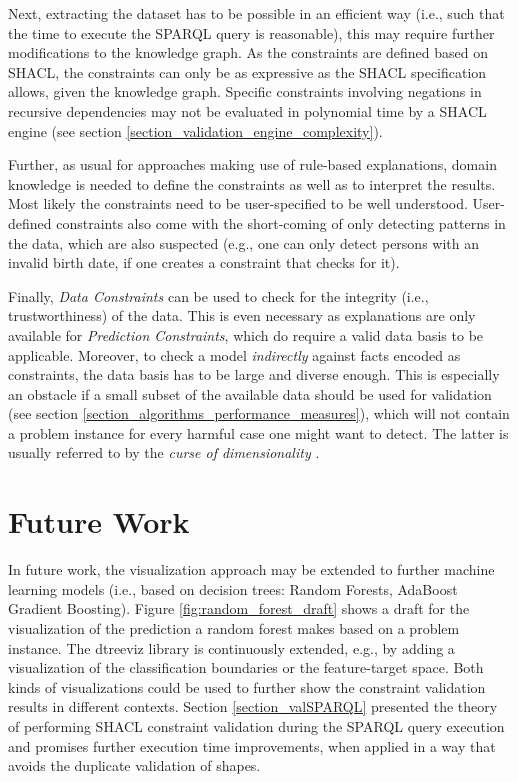 Next, extracting the dataset has to be possible in an efficient way (i.e., such that the time to execute the SPARQL query is reasonable), this may require further modifications to the knowledge graph. As the constraints are defined based on SHACL, the constraints can only be as expressive as the SHACL specification allows, given the knowledge graph. Specific constraints involving negations in recursive dependencies may not be evaluated in polynomial time by a SHACL engine (see section \ref{section_validation_engine_complexity}).

Further, as usual for approaches making use of rule-based explanations, domain knowledge is needed to define the constraints as well as to interpret the results. Most likely the constraints need to be user-specified to be well understood. User-defined constraints also come with the short-coming of only detecting patterns in the data, which are also suspected (e.g., one can only detect persons with an invalid birth date, if one creates a constraint that checks for it).

Finally, \emph{Data Constraints} can be used to check for the integrity (i.e., trustworthiness) of the data. This is even necessary as explanations are only available for \emph{Prediction Constraints}, which do require a valid data basis to be applicable. Moreover, to check a model \emph{indirectly} against facts encoded as constraints, the data basis has to be large and diverse enough. This is especially an obstacle if a small subset of the available data should be used for validation (see section \ref{section_algorithms_performance_measures}), which will not contain a problem instance for every harmful case one might want to detect. The latter is usually referred to by the \emph{curse of dimensionality} \cite{bishop2006pattern}. 

\section{Future Work}
In future work, the visualization approach may be extended to further machine learning models (i.e., based on decision trees: Random Forests, AdaBoost Gradient Boosting). Figure \ref{fig:random_forest_draft} shows a draft for the visualization of the prediction a random forest makes based on a problem instance. The dtreeviz library is continuously extended, e.g., by adding a visualization of the classification boundaries or the feature-target space. Both kinds of visualizations could be used to further show the constraint validation results in different contexts. Section \ref{section_valSPARQL} presented the theory of performing SHACL constraint validation during the SPARQL query execution and promises further execution time improvements, when applied in a way that avoids the duplicate validation of shapes.

